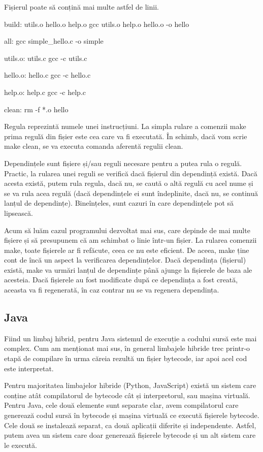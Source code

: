 Fișierul poate să conțină mai multe astfel de linii.

\begin{screen}
build: utils.o hello.o help.o
       gcc utils.o help.o hello.o -o hello

all:
       gcc simple_hello.c -o simple

utils.o: utils.c
       gcc -c utils.c

hello.o: hello.c
       gcc -c hello.c

help.o: help.c
       gcc -c help.c

clean:
       rm -f *.o hello
\end{screen}

Regula reprezintă numele unei instrucțiuni. La simpla rulare a comenzii make
prima regulă din fișier este cea care va fi executată. În schimb, dacă vom scrie
make clean, se va executa comanda aferentă regulii clean.

Dependințele sunt fișiere și/sau reguli necesare pentru a putea rula o regulă.
Practic, la rularea unei reguli se verifică dacă fișierul din dependință există.
Dacă acesta există, putem rula regula, dacă nu, se caută o altă regulă cu acel
nume și se va rula acea regulă (dacă dependințele ei sunt îndeplinite, dacă nu,
se continuă lanțul de dependințe). Bineînțeles, sunt cazuri în care dependințele
pot să lipsească.

Acum să luăm cazul programului dezvoltat mai sus, care depinde de mai multe
fișiere și să presupunem că am schimbat o linie într-un fișier. La rularea
comenzii make, toate fișierele ar fi refăcute, ceea ce nu este eficient. De
aceea, make ține cont de încă un aspect la verificarea dependințelor. Dacă
dependința (fișierul) există, make va urmări lanțul de dependințe până ajunge la
fișierele de baza ale acesteia. Dacă fișierele au fost modificate după ce
dependința a fost creată, aceasta va fi regenerată, în caz contrar nu se va
regenera dependința.

\subsection{Java}
\label{sec:appdev-ideinstall-java}

Fiind un limbaj hibrid, pentru Java sistemul de execuție a codului sursă este
mai complex. Cum am menționat mai sus, în general limbajele hibride trec
printr-o etapă de compilare în urma căreia rezultă un fișier bytecode, iar apoi
acel cod este interpretat.

Pentru majoritatea limbajelor hibride (Python, JavaScript) există un sistem care
conține atât compilatorul de bytecode cât și interpretorul, sau mașina virtuală.
Pentru Java, cele două elemente sunt separate clar, avem compilatorul care
generează codul sursă în bytecode și mașina virtuală ce execută fișierele
bytecode. Cele două se instalează separat, ca două aplicații diferite și
independente. Astfel, putem avea un sistem care doar generează fișierele
bytecode și un alt sistem care le execută.

